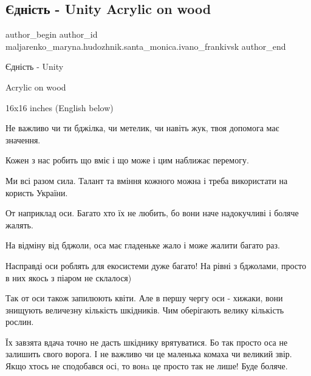 
 
 
 
 

\subsection{Єдність - Unity Acrylic on wood}
\label{sec:11_09_2022.fb.maljarenko_maryna.hudozhnik.santa_monica.ivano_frankivsk.1.jednist_unity_acrylic_on_wood}

\ifcmt
 author_begin
   author_id maljarenko_maryna.hudozhnik.santa_monica.ivano_frankivsk
 author_end
\fi

Єдність - Unity

Acrylic on wood 

16x16 inches (English below)

Не важливо чи ти бджілка, чи метелик, чи навіть жук, твоя допомога має
значення.

Кожен з нас робить що вміє і що може і цим наближає перемогу.

Ми всі разом сила. Талант та вміння кожного можна і треба використати на
користь України.

От наприклад оси. Багато хто їх не любить, бо вони наче надокучливі і боляче
жалять.

На відміну від бджоли, оса має гладеньке жало і може жалити багато раз.

Насправді оси роблять для екосистеми дуже багато! На рівні з бджолами, просто в
них якось з піаром не склалося)

Так от оси також запилюють квіти. Але в першу чергу оси - хижаки, вони знищують
величезну кількість шкідників. Чим оберігають велику кількість рослин.

Їх завзята вдача точно не дасть шкіднику врятуватися. Бо так просто оса не
залишить свого ворога. І не важливо чи це маленька комаха чи великий звір. Якщо
хтось не сподобався осі, то вонa це просто так не лише! Буде боляче. 

